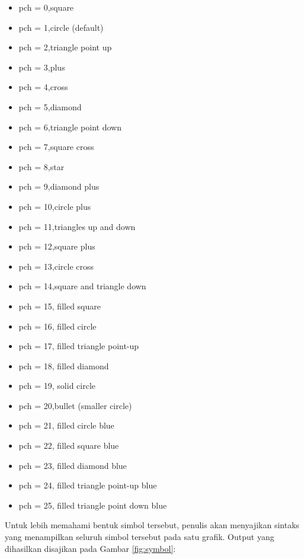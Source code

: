 \documentclass[]{book}
\providecommand{\tightlist}{%
  \setlength{\itemsep}{0pt}\setlength{\parskip}{0pt}}
\begin{document}
\begin{itemize}
\tightlist
\item
  pch = 0,square
\item
  pch = 1,circle (default)
\item
  pch = 2,triangle point up
\item
  pch = 3,plus
\item
  pch = 4,cross
\item
  pch = 5,diamond
\item
  pch = 6,triangle point down
\item
  pch = 7,square cross
\item
  pch = 8,star
\item
  pch = 9,diamond plus
\item
  pch = 10,circle plus
\item
  pch = 11,triangles up and down
\item
  pch = 12,square plus
\item
  pch = 13,circle cross
\item
  pch = 14,square and triangle down
\item
  pch = 15, filled square
\item
  pch = 16, filled circle
\item
  pch = 17, filled triangle point-up
\item
  pch = 18, filled diamond
\item
  pch = 19, solid circle
\item
  pch = 20,bullet (smaller circle)
\item
  pch = 21, filled circle blue
\item
  pch = 22, filled square blue
\item
  pch = 23, filled diamond blue
\item
  pch = 24, filled triangle point-up blue
\item
  pch = 25, filled triangle point down blue
\end{itemize}

Untuk lebih memahami bentuk simbol tersebut, penulis akan menyajikan
sintaks yang menampilkan seluruh simbol tersebut pada satu grafik.
Output yang dihasilkan disajikan pada Gambar \ref{fig:symbol}:
\end{document}
